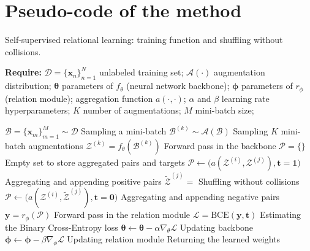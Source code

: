 \documentclass{article}
\begin{document}
\section{Pseudo-code of the method}\label{appendix:code}
\FloatBarrier

\begin{algorithm}[H]
\caption{Self-supervised relational learning: training function and shuffling without collisions.}
\label{alg:overview}
\textbf{Require:}  $\mathcal{D} = \{\mathbf{x}_n\}_{n=1}^{N}$ unlabeled training set; $\mathcal{A}(\cdot)$ augmentation distribution; $\boldsymbol{\theta}$ parameters of $f_{\theta}$ (neural network backbone); $\boldsymbol{\phi}$ parameters of $r_{\phi}$ (relation module); aggregation function $a(\cdot, \cdot)$; $\alpha$ and $\beta$ learning rate hyperparameters; $K$ number of augmentations; $M$ mini-batch size;\\
\begin{algorithmic}[1]
    \State $\mathcal{B}=\{\mathbf{x}_m\}_{m=1}^{M} \sim \mathcal{D}$ \Comment Sampling a mini-batch
        \State $\mathcal{B}^{(k)} \sim \mathcal{A}(\mathcal{B}) $ \Comment Sampling $K$ mini-batch augmentations
        \State $\mathcal{Z}^{(k)} = f_{\theta}(\mathcal{B}^{(k)})$ \Comment Forward pass in the backbone
    \EndFor
    \State $\mathcal{P} = \{ \}$ \Comment Empty set to store aggregated pairs and targets
            \State $\mathcal{P} \leftarrow \big( a(\mathcal{Z}^{(i)}, \mathcal{Z}^{(j)}), \mathbf{t}=\boldsymbol{1} \big)$ \Comment Aggregating and appending positive pairs
            \State $\tilde{\mathcal{Z}}^{(j)} =$  \Comment Shuffling without collisions
            \State $\mathcal{P} \leftarrow \big( a(\mathcal{Z}^{(i)}, \tilde{\mathcal{Z}}^{(j)}), \mathbf{t}=\boldsymbol{0} \big)$ \Comment Aggregating and appending negative pairs
       \EndFor 
    \EndFor
    \State $\mathbf{y} = r_{\phi}(\mathcal{P})$ \Comment Forward pass in the relation module
    \State $\mathcal{L}=\text{BCE}(\mathbf{y}, \mathbf{t})$ \Comment Estimating the Binary Cross-Entropy loss
    \State $\boldsymbol{\theta} \leftarrow \boldsymbol{\theta} - \alpha \nabla_{\theta} \mathcal{L}$ \Comment Updating backbone
    \State $\boldsymbol{\phi} \leftarrow \boldsymbol{\phi} - \beta \nabla_{\phi} \mathcal{L}$ \Comment Updating relation module
\EndWhile
\State \Return{$\boldsymbol{\theta}, \boldsymbol{\phi}$} \Comment Returning the learned weights

\end{algorithmic}
\end{algorithm}
\end{document}
